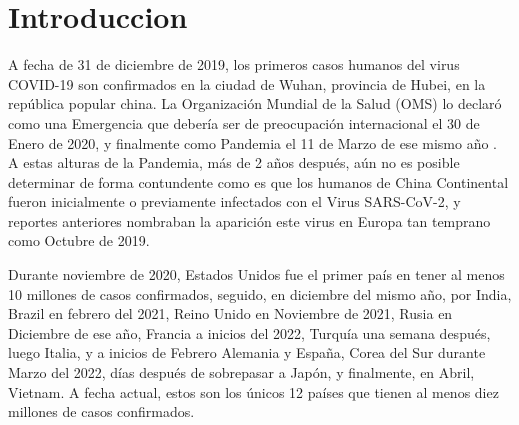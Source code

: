 
\section{Introduccion}
A fecha de 31 de diciembre de 2019, los primeros casos humanos del virus COVID-19 son confirmados en la ciudad de Wuhan, provincia de Hubei, en la república popular china. La Organización Mundial de la Salud (OMS) lo declaró como una Emergencia que debería ser de preocupación internacional el 30 de Enero de 2020, y finalmente como Pandemia el 11 de Marzo de ese mismo año \cite{organization_2020}. A estas alturas de la Pandemia, más de 2 años después, aún no es posible determinar de forma contundente como es que los humanos de China Continental fueron inicialmente o previamente infectados con el Virus SARS-CoV-2, y reportes anteriores nombraban la aparición este virus en Europa tan temprano como Octubre de 2019.\cite{sakay_2021}

Durante noviembre de 2020, Estados Unidos fue el primer país en tener al menos 10 millones de casos confirmados\cite{stein_2020}, seguido, en diciembre del mismo año, por India\cite{asrar_2020}, Brazil en febrero del 2021\cite{leite_2021}, Reino Unido en Noviembre de 2021\cite{standard_2021}, Rusia en Diciembre de ese año\cite{asia_2021}, Francia a inicios del 2022\cite{television_2022}, Turquía una semana después, luego Italia, y a inicios de Febrero Alemania y España, Corea del Sur durante Marzo del 2022, días después de sobrepasar a Japón, y finalmente, en Abril, Vietnam. A fecha actual, estos son los únicos 12 países que tienen al menos diez millones de casos confirmados.